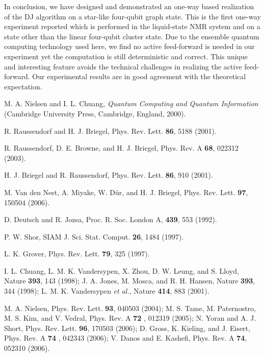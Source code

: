 \documentclass[showpacs,superscriptaddress,twocolumn,prl]{revtex4}
\begin{document}
In conclusion, we have designed and demonstrated an one-way based
realization of the DJ algorithm on a star-like four-qubit graph state. This
is the first one-way experiment reported which is performed in the
liquid-state NMR system and on a state other than the linear four-qubit
cluster state. Due to the ensemble quantum computing technology used here,
we find no active feed-forward is needed in our experiment yet the
computation is still deterministic and correct. This unique and interesting
feature avoids the technical challenges in realizing the active
feed-forward. Our experimental results are in good agreement with the
theoretical expectation.

\begin{thebibliography}{99}
 M. A. Nielsen and I. L. Chuang, \textit{Quantum Computing
and Quantum Information} (Cambridge University Press, Cambridge, England,
2000).

 R. Raussendorf and H. J. Briegel, Phys. Rev. Lett.
\textbf{86}, 5188 (2001).

 R. Raussendorf, D. E. Browne, and H. J. Briegel, Phys.
Rev. A \textbf{68}, 022312 (2003).

 H. J. Briegel and R. Raussendorf, Phys. Rev. Lett.
\textbf{86}, 910 (2001).

 M. Van den Nest, A. Miyake, W. D\"{u}r, and H. J.
Briegel, Phys. Rev. Lett. \textbf{97}, 150504 (2006).

 D. Deutsch and R. Jozsa, Proc. R. Soc. London A, \textbf{439},
553 (1992).

 P. W. Shor, SIAM J. Sci. Stat. Comput. \textbf{26}, 1484
(1997).

 L. K. Grover, Phys. Rev. Lett. \textbf{79}, 325 (1997).

 I. L. Chuang, L. M. K. Vandersypen, X. Zhou, D. W. Leung,
and S. Lloyd, Nature \textbf{393}, 143 (1998); J. A. Jones, M. Mosca, and R.
H. Hansen, Nature \textbf{393}, 344 (1998); L. M. K. Vandersypen \textit{et
al.}, Nature \textbf{414}, 883 (2001).

 M. A. Nielsen, Phys. Rev. Lett. \textbf{93}, 040503 (2004);
M. S. Tame, M. Paternostro, M. S. Kim, and V. Vedral, Phys. Rev. A \textbf{72%
}, 012319 (2005); N. Yoran and A. J. Short, Phys. Rev. Lett. \textbf{96},
170503 (2006); D. Gross, K. Kieling, and J. Eisert, Phys. Rev. A \textbf{74}%
, 042343 (2006); V. Danos and E. Kashefi, Phys. Rev. A \textbf{74}, 052310
(2006).


\end{thebibliography}
\end{document}
